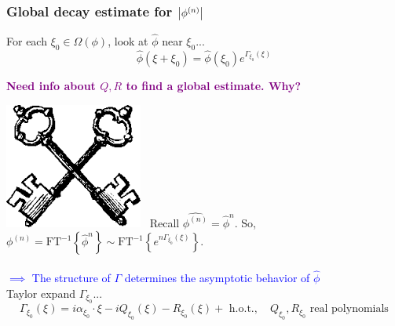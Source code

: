 \documentclass{beamer}
\theoremstyle{definition}
\begin{document}
\begin{frame}
\frametitle{Global decay estimate for $\abs{\phi^{(n)}}$}
For each $\xi_0\in \Omega(\phi)$, look at $\widehat{\phi}$ near $\xi_0$...
\begin{equation*}
\widehat{\phi}(\xi+\xi_0) = \widehat{\phi}(\xi_0) e^{\Gamma_{\xi_0}(\xi)}
\end{equation*}





\begin{center}
	\textbf{\textcolor{purple}{Need info about $Q,R$ to find a global estimate. Why?}}
\end{center}





\includegraphics[scale=0.06]{key}$\,\,\,$ Recall $\widehat{\phi^{(n)}} = \widehat{\phi}^{n}$. So, $\phi^{(n)} = \text{FT}^{-1}\left\{ \widehat{\phi}^{n}  \right\} \sim \text{FT}^{-1}\left\{ e^{n\Gamma_{\xi_0}(\xi)} \right\}$.\\
$\,$\\



\textcolor{blue}{$\implies$ The structure of $\Gamma$ determines the asymptotic behavior of $\widehat{\phi}$} \\

Taylor expand $\Gamma_{\xi_0}$...
\begin{equation*}
\Gamma_{\xi_0}(\xi)=i\alpha_{\xi_0}\cdot\xi -iQ_{\xi_0}(\xi)  -R_{\xi_0}(\xi) + \text{ h.o.t.}, \quad Q_{\xi_0}, R_{\xi_0} \text{ real polynomials}
\end{equation*}



\end{frame}
\end{document}
